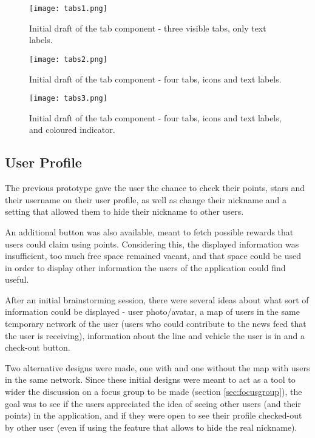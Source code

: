 \begin{figure}[h!]
  \begin{center}
    \leavevmode
    \texttt{[image: tabs1.png]}
    \caption{Initial draft of the tab component - three visible tabs, only text labels.}
    \label{fig:tabs1}
  \end{center}
\end{figure}

\begin{figure}[h!]
  \begin{center}
    \leavevmode
    \texttt{[image: tabs2.png]}
    \caption{Initial draft of the tab component - four tabs, icons and text labels.}
    \label{fig:tabs2}
  \end{center}
\end{figure}

\begin{figure}[h!]
  \begin{center}
    \leavevmode
    \texttt{[image: tabs3.png]}
    \caption{Initial draft of the tab component - four tabs, icons and text labels, and coloured indicator.}
    \label{fig:tabs3}
  \end{center}
\end{figure}

\subsection{User Profile}

The previous prototype gave the user the chance to check their points, stars and their username on their user profile, as well as change their nickname and a setting that allowed them to hide their nickname to other users. 

An additional button was also available, meant to fetch possible rewards that users could claim using points. Considering this, the displayed information was insufficient, too much free space remained vacant, and that space could be used in order to display other information the users of the application could find useful.

After an initial brainstorming session, there were several ideas about what sort of information could be displayed - user photo/avatar, a map of users in the same temporary network of the user (users who could contribute to the news feed that the user is receiving), information about the line and vehicle the user is in and a check-out button.

Two alternative designs were made, one with and one without the map with users in the same network. Since these initial designs were meant to act as a tool to wider the discussion on a focus group to be made (section \ref{sec:focusgroup}), the goal was to see if the users appreciated the idea of seeing other users (and their points) in the application, and if they were open to see their profile checked-out by other user (even if using the feature that allows to hide the real nickname).


